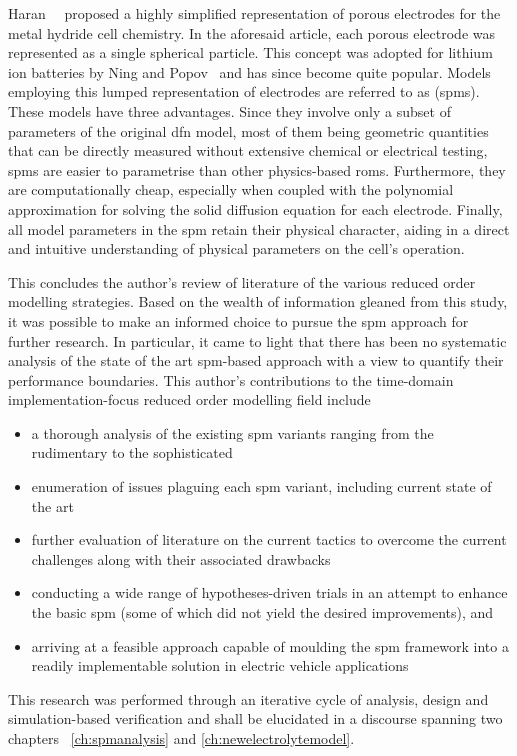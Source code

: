 Haran~\etal{}~\cite{Haran1998}  proposed a  highly simplified  representation of
porous  electrodes  for the  metal  hydride  cell  chemistry. In  the  aforesaid
article,  each   porous  electrode  was   represented  as  a   single  spherical
particle.  This concept  was  adopted  for lithium  ion  batteries  by Ning  and
Popov~\cite{Ning2004} and has since become  quite popular. Models employing this
lumped  representation  of  electrodes  are referred  to  as  
(\glspl{spm}).  These models  have  three advantages.  Since  they involve  only
a  subset  of  parameters  of  the   original  \gls{dfn}  model,  most  of  them
being  geometric quantities  that  can be  directly  measured without  extensive
chemical  or electrical  testing,  \glspl{spm} are  easier  to parametrise  than
other physics-based  \glspl{rom}. Furthermore,  they are  computationally cheap,
especially when coupled with the  polynomial approximation for solving the solid
diffusion  equation for  each electrode.  Finally, all  model parameters  in the
\gls{spm}  retain their  physical character,  aiding in  a direct  and intuitive
understanding of physical parameters on the cell's operation.

This concludes  the author's review of  literature of the various  reduced order
modelling  strategies. Based  on the  wealth  of information  gleaned from  this
study,  it was  possible to  make  an informed  choice to  pursue the  \gls{spm}
approach  for further  research.  In particular,  it came  to  light that  there
has  been  no systematic  analysis  of  the  state  of the  art  \gls{spm}-based
approach with  a view  to quantify their  performance boundaries.  This author's
contributions to  the time-domain  implementation-focus reduced  order modelling
field include
\begin{itemize}[noitemsep,topsep=0pt, before={\vspace*{-0.25\baselineskip}}]
    \item a thorough analysis of the existing \gls{spm} variants ranging from the rudimentary to the sophisticated
    \item enumeration of issues plaguing each \gls{spm} variant, including current state of the art
    \item further evaluation of literature on the current tactics to overcome the current challenges along with their associated drawbacks
    \item conducting a  wide range of hypotheses-driven trials in an attempt to enhance  the basic \gls{spm} (some of which did not yield the desired
        improvements), and
    \item arriving at  a  feasible  approach  capable  of  moulding  the
        \gls{spm}  framework into  a  readily implementable  solution in
        electric vehicle applications
\end{itemize}
This research was  performed through an iterative cycle of  analysis, design and
simulation-based verification  and shall be  elucidated in a  discourse spanning
two chapters \viz~\cref{ch:spmanalysis} and \cref{ch:newelectrolytemodel}.

